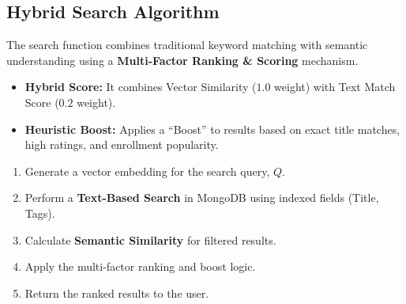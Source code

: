 \subsection{Hybrid Search Algorithm}
The search function combines traditional keyword matching with semantic understanding using a \textbf{Multi-Factor Ranking \& Scoring} mechanism.

\begin{itemize}
    \item \textbf{Hybrid Score:} It combines Vector Similarity ($1.0$ weight) with Text Match Score ($0.2$ weight).
    \item \textbf{Heuristic Boost:} Applies a ``Boost'' to results based on exact title matches, high ratings, and enrollment popularity.
\end{itemize}

\begin{enumerate}
    \item Generate a vector embedding for the search query, $Q$.
    \item Perform a \textbf{Text-Based Search} in MongoDB using indexed fields (Title, Tags).
    \item Calculate \textbf{Semantic Similarity} for filtered results.
    \item Apply the multi-factor ranking and boost logic.
    \item Return the ranked results to the user.
\end{enumerate}
